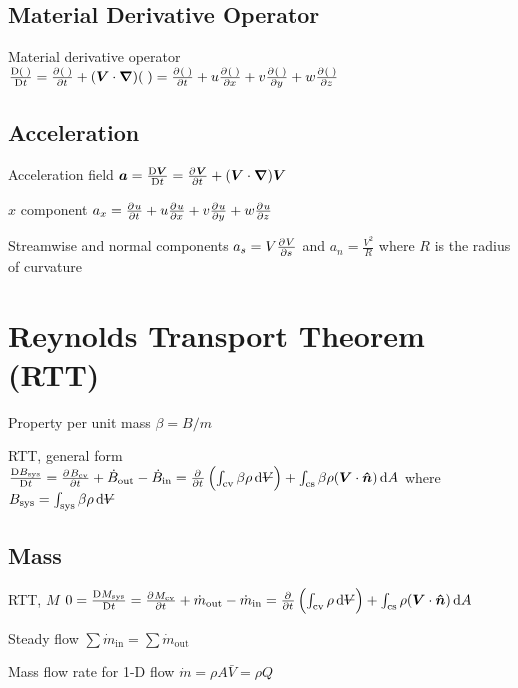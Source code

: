 \documentclass{article}
\begin{document}
\subsection{Material Derivative Operator}
\begin{description*}
\item[Material derivative operator]
  \(\frac{\Dif{(\;)}}{\Dif t} = \pd{(\;)}{t} + (\vec V \cdot \del)(\;)
  = \pd{(\;)}{t} + u\pd{(\;)}{x} + v\pd{(\;)}{y} + w\pd{(\;)}{z}\)
\end{description*}

\subsection{Acceleration}
\begin{description*}
\item[Acceleration field]
  \(\vec a = \frac{\Dif\vec{V}}{\Dif t} = \pd{\vec V}{t} + (\vec{V}\cdot\del)\vec{V}\)
\item[$x$ component]
  \(a_x = \pd{u}{t} + u\pd{u}{x} + v\pd{u}{y} + w\pd{u}{z}\)
\item[Streamwise and normal components]
  \(a_s = V\pd{V}{s}\) and \(a_n = \frac{V^2}{R}\)
  where $R$ is the radius of curvature
\end{description*}

\section{Reynolds Transport Theorem (RTT)}
\begin{description*}
\item[Property per unit mass]
  \(\beta = B/m\)
\item[RTT, general form]
  \(\frac{\Dif B_\mathrm{sys}}{\Dif t}
  = \pd{B_\mathrm{cv}}{t}+\dot{B}_\mathrm{out} - \dot{B}_\mathrm{in}
  = \pd{}{t}\left(\int_\mathrm{cv}\beta\rho\dif{\volsym}\right)
  + \int_\mathrm{cs}\beta\rho(\vec{V}\cdot\uvec{n})\dif{A}\)
  where
  \(B_\mathrm{sys} = \int_\mathrm{sys}\beta\rho\dif{\volsym}\)
\end{description*}

\subsection{Mass}
\begin{description*}
\item[RTT, $M$]
  \(0 = \frac{\Dif M_\mathrm{sys}}{\Dif t}
  = \pd{M_\mathrm{cv}}{t}+\dot{m}_\mathrm{out}-\dot{m}_\mathrm{in}
  = \pd{}{t}\left(\int_\mathrm{cv}\rho\dif{\volsym}\right)
  + \int_\mathrm{cs}\rho(\vec{V}\cdot\uvec{n})\dif{A}\)
\item[Steady flow]
  \(\sum\dot{m}_\mathrm{in} = \sum\dot{m}_\mathrm{out}\)
\item[Mass flow rate for 1-D flow]
  \(\dot{m} = \rho A \bar{V} = \rho Q\)
\end{description*}
\end{document}
